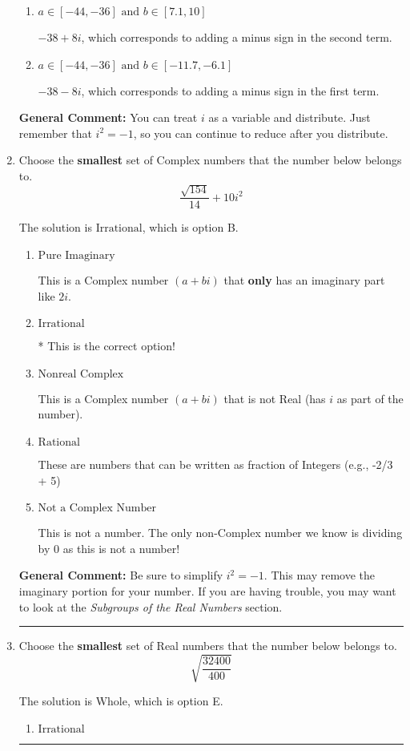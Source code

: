 \documentclass{extbook}[14pt]
\newcommand{\litem}[1]{\item #1

\rule{\textwidth}{0.4pt}}
\begin{document}
\begin{enumerate}
{\begin{enumerate}[label=\Alph*.]
 $22 + 32 i$, which corresponds to adding a minus sign in both terms.
\item \( a \in [-44, -36] \text{ and } b \in [7.1, 10] \)

 $-38 + 8 i$, which corresponds to adding a minus sign in the second term.
\item \( a \in [-44, -36] \text{ and } b \in [-11.7, -6.1] \)

 $-38 - 8 i$, which corresponds to adding a minus sign in the first term.
\end{enumerate}

\textbf{General Comment:} You can treat $i$ as a variable and distribute. Just remember that $i^2=-1$, so you can continue to reduce after you distribute.
}
\litem{
Choose the \textbf{smallest} set of Complex numbers that the number below belongs to.
\[ \frac{\sqrt{154}}{14}+10i^2 \]

The solution is \( \text{Irrational} \), which is option B.\begin{enumerate}[label=\Alph*.]
\item \( \text{Pure Imaginary} \)

This is a Complex number $(a+bi)$ that \textbf{only} has an imaginary part like $2i$.
\item \( \text{Irrational} \)

* This is the correct option!
\item \( \text{Nonreal Complex} \)

This is a Complex number $(a+bi)$ that is not Real (has $i$ as part of the number).
\item \( \text{Rational} \)

These are numbers that can be written as fraction of Integers (e.g., -2/3 + 5)
\item \( \text{Not a Complex Number} \)

This is not a number. The only non-Complex number we know is dividing by 0 as this is not a number!
\end{enumerate}

\textbf{General Comment:} Be sure to simplify $i^2 = -1$. This may remove the imaginary portion for your number. If you are having trouble, you may want to look at the \textit{Subgroups of the Real Numbers} section.
}
\litem{
Choose the \textbf{smallest} set of Real numbers that the number below belongs to.
\[ \sqrt{\frac{32400}{400}} \]

The solution is \( \text{Whole} \), which is option E.\begin{enumerate}[label=\Alph*.]
\item \( \text{Irrational} \)


\end{enumerate}}
\end{enumerate}
\end{document}
